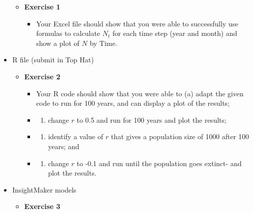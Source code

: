 \documentclass[
]{article}
\providecommand{\tightlist}{%
  \setlength{\itemsep}{0pt}\setlength{\parskip}{0pt}}
\begin{document}
\begin{itemize}
  \begin{itemize}
  \tightlist
  \item
    \textbf{Exercise 1}

    \begin{itemize}
    \tightlist
    \item
      Your Excel file should show that you were able to successfully use
      formulas to calculate \(N_t\) for each time step (year and month)
      and show a plot of \(N\) by Time.
    \end{itemize}
  \end{itemize}
\item
  R file (submit in Top Hat)

  \begin{itemize}
  \tightlist
  \item
    \textbf{Exercise 2}

    \begin{itemize}
    \item
      Your R code should show that you were able to (a) adapt the given
      code to run for 100 years, and can display a plot of the results;
    \item
      \begin{enumerate}
      \def\labelenumi{(\alph{enumi})}
      \setcounter{enumi}{1}
      \tightlist
      \item
        change \(r\) to 0.5 and run for 100 years and plot the results;
      \end{enumerate}
    \item
      \begin{enumerate}
      \def\labelenumi{(\alph{enumi})}
      \setcounter{enumi}{2}
      \tightlist
      \item
        identify a value of \(r\) that gives a population size of 1000
        after 100 years; and
      \end{enumerate}
    \item
      \begin{enumerate}
      \def\labelenumi{(\alph{enumi})}
      \setcounter{enumi}{3}
      \tightlist
      \item
        change \(r\) to -0.1 and run until the population goes extinct-
        and plot the results.
      \end{enumerate}
    \end{itemize}
  \end{itemize}
\item
  InsightMaker models

  \begin{itemize}
  \tightlist
  \item
    \textbf{Exercise 3}


\end{itemize}
\end{itemize}
\end{document}
